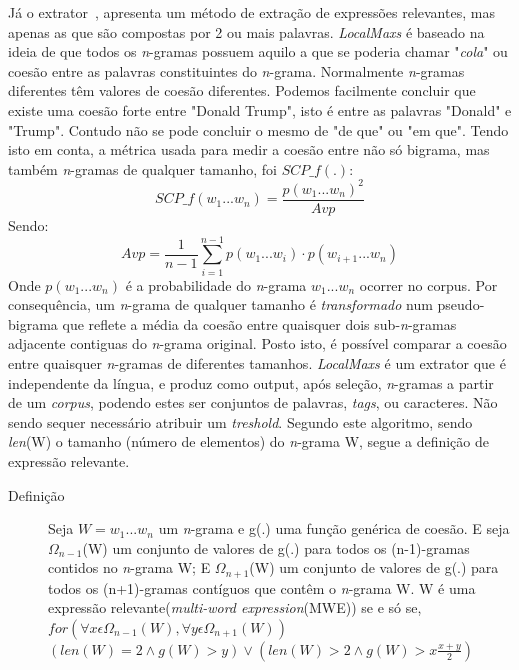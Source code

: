 Já o extrator~\cite{da1999local}, apresenta um método de extração de expressões relevantes, mas apenas as que são compostas por 2 ou mais palavras. \textit{LocalMaxs} é baseado na ideia de que todos os \textit{n}-gramas possuem aquilo a que se poderia chamar "\textit{cola}" \thinspace ou coesão entre as palavras constituintes do \textit{n}-grama. Normalmente \textit{n}-gramas diferentes têm valores de coesão diferentes. Podemos facilmente concluir que existe uma coesão forte entre "Donald Trump", isto é entre as palavras "Donald" \thinspace e "Trump". Contudo não se pode concluir o mesmo de "de que" \thinspace ou "em que". Tendo isto em conta, a métrica usada para medir a coesão entre não só bigrama, mas também \textit{n}-gramas de qualquer tamanho, foi $SCP\_f(.)$:
\begin{equation}
    SCP\_f(w_{1} ... w_{n}) = \frac{p(w_{1} ... w_{n})^{2}}{Avp}
\end{equation}
Sendo:
\begin{equation}
    Avp = \frac{1}{n-1}\sum_{i=1}^{n-1}p(w_{1}...w_{i})\cdot p(w_{i+1}...w_{n})
\end{equation}
Onde $p(w_{1}...w_{n})$ é a probabilidade do \textit{n}-grama $w_{1}...w_{n}$ ocorrer no corpus. Por consequência, um \textit{n}-grama de qualquer tamanho é \textit{transformado} num pseudo-bigrama que reflete a média da coesão entre quaisquer dois sub-\textit{n}-gramas adjacente contiguas do \textit{n}-grama original. Posto isto, é possível comparar a coesão entre quaisquer \textit{n}-gramas de diferentes tamanhos.
\textit{LocalMaxs} é um extrator que é independente da língua, e produz como output, após seleção, \textit{n}-gramas a partir de um \textit{corpus}, podendo estes ser conjuntos de palavras, \textit{tags}, ou caracteres. Não sendo sequer necessário atribuir um \textit{treshold}.
Segundo este algoritmo, sendo \textit{len}(W) o tamanho (número de elementos) do \textit{n}-grama W, segue a definição de expressão relevante.
\begin{description}
    \item [Definição] Seja $W = w_{1}...w_{n}$ um \textit{n}-grama e g(.) uma função genérica de coesão. E seja $\Omega_{n-1}$(W) um conjunto de valores de g(.) para todos os (n-1)-gramas contidos no \textit{n}-grama W;
    E $\Omega_{n+1}$(W) um conjunto de valores de g(.) para todos os (n+1)-gramas contíguos que contêm o \textit{n}-grama W.
    W é uma expressão relevante(\textit{multi-word expression}(MWE)) se e só se, \\
    $for (\forall x \epsilon \Omega_{n-1}(W), \forall y \epsilon \Omega_{n+1}(W))$ \\
     $(\textit{len}(W) = 2 \wedge g(W) > y) \vee (\textit{len}(W) > 2 \wedge g(W) > x\frac{x+y}{2})$
\end{description}

